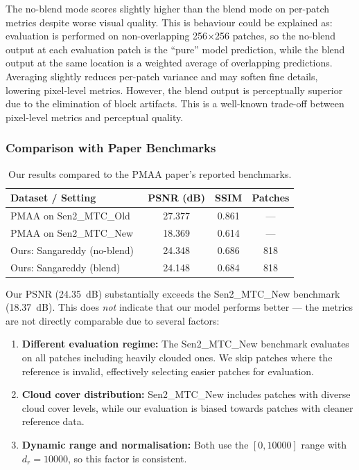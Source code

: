 \documentclass[12pt,a4paper]{article}
\begin{document}
The no-blend mode scores slightly higher than the blend mode on per-patch metrics despite worse visual quality. This is behaviour could be explained as: evaluation is performed on non-overlapping 256$\times$256 patches, so the no-blend output at each evaluation patch is the ``pure'' model prediction, while the blend output at the same location is a weighted average of overlapping predictions. Averaging slightly reduces per-patch variance and may soften fine details, lowering pixel-level metrics. However, the blend output is perceptually superior due to the elimination of block artifacts. This is a well-known trade-off between pixel-level metrics and perceptual quality.

\subsubsection{Comparison with Paper Benchmarks}

\begin{table}[H]
\centering
\caption{Our results compared to the PMAA paper's reported benchmarks.}
\label{tab:comparison}
\begin{tabular}{lccc}
\toprule
\textbf{Dataset / Setting} & \textbf{PSNR (dB)} & \textbf{SSIM} & \textbf{Patches} \\
\midrule
PMAA on Sen2\_MTC\_Old~\cite{zou2023pmaa} & 27.377 & 0.861 & --- \\
PMAA on Sen2\_MTC\_New~\cite{zou2023pmaa} & 18.369 & 0.614 & --- \\
\midrule
Ours: Sangareddy (no-blend) & 24.348 & 0.686 & 818 \\
Ours: Sangareddy (blend) & 24.148 & 0.684 & 818 \\
\bottomrule
\end{tabular}
\end{table}

Our PSNR (24.35~dB) substantially exceeds the Sen2\_MTC\_New benchmark (18.37~dB). This does \textit{not} indicate that our model performs better --- the metrics are not directly comparable due to several factors:

\begin{enumerate}[leftmargin=2em]
    \item \textbf{Different evaluation regime:} The Sen2\_MTC\_New benchmark evaluates on all patches including heavily clouded ones. We skip patches where the reference is invalid, effectively selecting easier patches for evaluation.
    \item \textbf{Cloud cover distribution:} Sen2\_MTC\_New includes patches with diverse cloud cover levels, while our evaluation is biased towards patches with cleaner reference data.
    \item \textbf{Dynamic range and normalisation:} Both use the $[0, 10000]$ range with $d_r = 10000$, so this factor is consistent.
\end{enumerate}
\end{document}
